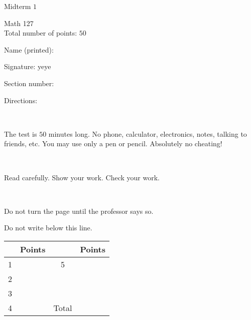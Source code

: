\documentclass{article}
\begin{document}
\renewcommand{\headrulewidth}{0pt}
\fontsize{11}{18}\selectfont
\begin{center}
\begin{bfseries}
\noindent \Large{Midterm $1$} \\ 
\end{bfseries} 
\vspace{0.3cm}
\large{Math 127} \\
\large{Total number of points: $50$}
\end{center}

\begin{center}
Name (printed): \underline{\hspace{4in}}
 

 
Signature: \underline{\hspace{4in}}
yeye 

 
Section number: \underline{\hspace{1in}}
 
 
\end{center}

\normalsize

\vfill

Directions:

\

The test is $50$ minutes long. No phone, calculator, electronics, notes, talking to friends, etc. You may use only a pen or pencil. Absolutely no cheating!

\


Read carefully. Show your work. Check your work.

\

Do not turn the page until the professor says so.
\vfill

\large
Do not write below this line. 


\noindent\makebox[\linewidth]{\rule{\paperwidth}{0.4pt}}

\vfill

\huge
{%
\begin{center}
\begin{tabular}{| c | c | c | c |}
\hline
  & Points &  & Points \\ \hline
1 &  & 5 & \\ \hline
2 &  &  & \\ \hline
3 &  &  & \\ \hline
4 &  & Total & \\ \hline 
\end{tabular}
\end{center}
}%
\end{document}
